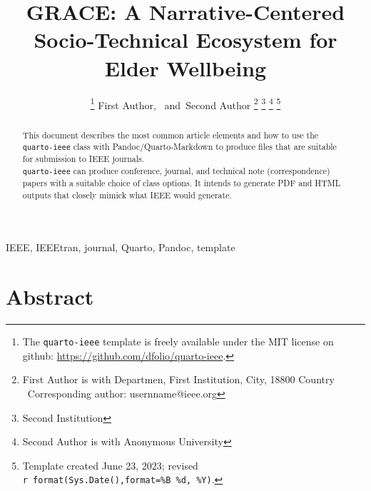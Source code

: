 \documentclass[
  journal,
]{IEEEtran}%
\title{GRACE: A Narrative-Centered Socio-Technical Ecosystem for Elder
Wellbeing}
\author{
\thanks{The \texttt{quarto-ieee} template is freely available under the
MIT license on github: \url{https://github.com/dfolio/quarto-ieee}.}
First Author\orcidlink{0000-0001-9430-6091},~\IEEEmembership{Senior
Member, IEEE}
and~Second Author%
\thanks{First Author is with Departmen, First
Institution, City, 18800 Country%
  Corresponding author: usernname@ieee.org
}
\thanks{Second Institution}
\thanks{Second Author is with Anonymous University%
}
\thanks{Template created June 23, 2023; revised
\texttt{r\ format(Sys.Date(),format=\textquotesingle{}\%B\ \%d,\ \%Y\textquotesingle{})}.}
}
\begin{document}


\maketitle

\begin{abstract}
This document describes the most common article elements and how to use
the \texttt{quarto-ieee} class with Pandoc/Quarto-Markdown to produce
files that are suitable for submission to IEEE journals.\\
\texttt{quarto-ieee} can produce conference, journal, and technical note
(correspondence) papers with a suitable choice of class options. It
intends to generate PDF and HTML outputs that closely mimick what IEEE
would generate.
\end{abstract}
\begin{IEEEkeywords}
IEEE, IEEEtran, journal, Quarto, Pandoc, template
\end{IEEEkeywords}

%


\section{Abstract}\label{abstract}
\end{document}
